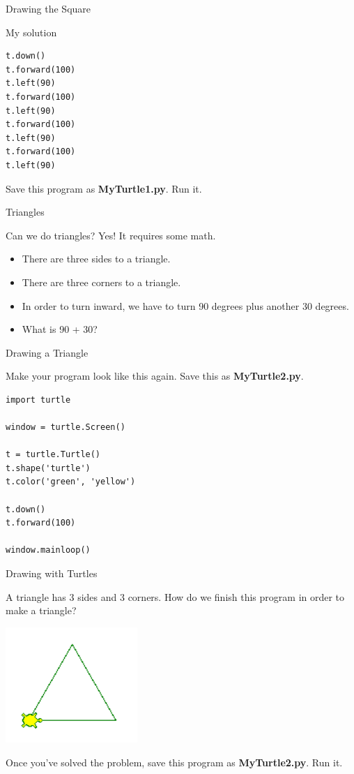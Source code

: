 \documentclass{beamer}
\begin{document}
\begin{frame}[fragile]{Drawing the Square}

My solution

\begin{verbatim}
t.down()
t.forward(100)
t.left(90)
t.forward(100)
t.left(90)
t.forward(100)
t.left(90)
t.forward(100)
t.left(90)
\end{verbatim}

Save this program as \textbf{MyTurtle1.py}. Run it.
\end{frame}

\begin{frame}{Triangles}

Can we do triangles? Yes! It requires some math.

\begin{itemize}
\item There are three sides to a triangle.
\item There are three corners to a triangle.
\item In order to turn inward, we have to turn 90 degrees plus another 30 degrees.
\item What is 90 + 30?
\end{itemize}

\end{frame}

\begin{frame}[fragile]{Drawing a Triangle}

Make your program look like this again. Save this as \textbf{MyTurtle2.py}.

\begin{verbatim}
import turtle

window = turtle.Screen()

t = turtle.Turtle()
t.shape('turtle')
t.color('green', 'yellow')

t.down()
t.forward(100)

window.mainloop()
\end{verbatim}

\end{frame}

\begin{frame}{Drawing with Turtles}

A triangle has 3 sides and 3 corners. How do we finish this program in order to make a triangle?

\includegraphics[width=50mm]{images/turtleTriangle.png}

Once you've solved the problem, save this program as \textbf{MyTurtle2.py}. Run it.
\end{frame}
\end{document}

